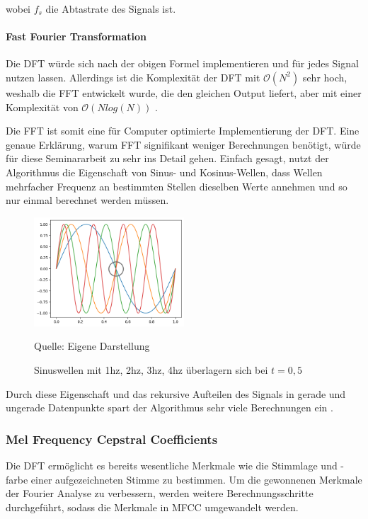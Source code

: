 wobei $f_s$ die Abtastrate des Signals ist.

\paragraph{Fast Fourier Transformation}

Die \ac{DFT} würde sich nach der obigen Formel implementieren und für jedes Signal nutzen lassen.
Allerdings ist die Komplexität der \ac{DFT} mit $\mathcal{O}(N^2)$ sehr hoch, weshalb die \ac{FFT} entwickelt wurde, die den gleichen Output liefert, aber mit einer Komplexität von $\mathcal{O}(N log(N))$ \autocite[vgl.][S. 338]{beucher_signale_2011}.

Die \ac{FFT} ist somit eine für Computer optimierte Implementierung der \ac{DFT}.
Eine genaue Erklärung, warum \ac{FFT} signifikant weniger Berechnungen benötigt, würde für diese Seminararbeit zu sehr ins Detail gehen.
Einfach gesagt, nutzt der Algorithmus die Eigenschaft von Sinus- und Kosinus-Wellen, dass Wellen mehrfacher Frequenz an bestimmten Stellen dieselben Werte annehmen und so nur einmal berechnet werden müssen.

\begin{figure}
    \centering
    \includegraphics[width=0.5\textwidth]{images/fft-advantage.png}
    \caption{Sinuswellen mit 1hz, 2hz, 3hz, 4hz überlagern sich bei $t=0,5$}{Quelle: Eigene Darstellung}
    \label{fig:fft-advantage}
\end{figure}\noindent

Durch diese Eigenschaft und das rekursive Aufteilen des Signals in gerade und ungerade Datenpunkte spart der Algorithmus sehr viele Berechnungen ein \autocite[vgl.][S. 643]{oppenheim_discrete-time_1999}.

\subsubsection{Mel Frequency Cepstral Coefficients}
Die \ac{DFT} ermöglicht es bereits wesentliche Merkmale wie die Stimmlage und -farbe einer aufgezeichneten Stimme zu bestimmen.
Um die gewonnenen Merkmale der Fourier Analyse zu verbessern, werden weitere Berechnungsschritte durchgeführt, sodass die Merkmale in \ac{MFCC} umgewandelt werden.

